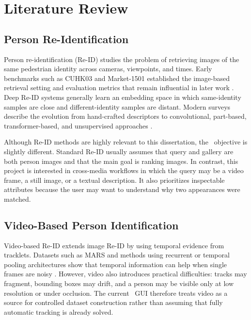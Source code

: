\chapter{Literature Review}
\label{ch:literature-review}

\section{Person Re-Identification}

Person re-identification (Re-ID) studies the problem of retrieving images of the same pedestrian identity across cameras, viewpoints, and times. Early benchmarks such as CUHK03 and Market-1501 established the image-based retrieval setting and evaluation metrics that remain influential in later work \citep{li2014deepreid,zheng2015scalable}. Deep Re-ID systems generally learn an embedding space in which same-identity samples are close and different-identity samples are distant. Modern surveys describe the evolution from hand-crafted descriptors to convolutional, part-based, transformer-based, and unsupervised approaches \citep{zheng2016person,ye2021deep}.

Although Re-ID methods are highly relevant to this dissertation, the \systemname\ objective is slightly different. Standard Re-ID usually assumes that query and gallery are both person images and that the main goal is ranking images. In contrast, this project is interested in cross-media workflows in which the query may be a video frame, a still image, or a textual description. It also prioritizes inspectable attributes because the user may want to understand why two appearances were matched.

\section{Video-Based Person Identification}

Video-based Re-ID extends image Re-ID by using temporal evidence from tracklets. Datasets such as MARS and methods using recurrent or temporal pooling architectures show that temporal information can help when single frames are noisy \citep{zheng2016mars,mcLaughlin2016recurrent}. However, video also introduces practical difficulties: tracks may fragment, bounding boxes may drift, and a person may be visible only at low resolution or under occlusion. The current \systemname\ GUI therefore treats video as a source for controlled dataset construction rather than assuming that fully automatic tracking is already solved.

